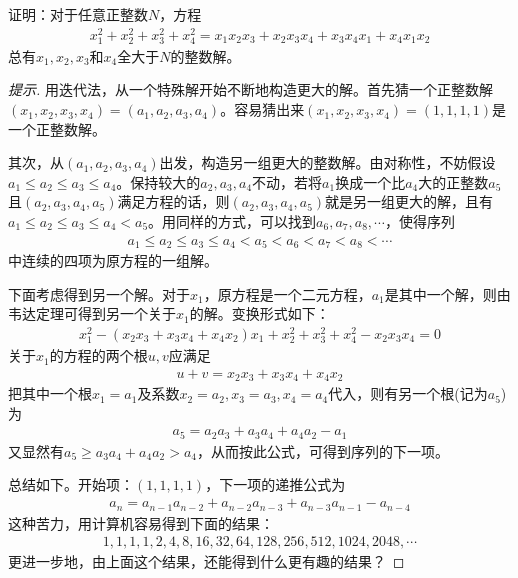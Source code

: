 \begin{example}[Putnam 1988]
  证明：对于任意正整数$N$，方程
  \begin{align*}
    x_1^2+x_2^2+x_3^2+x_4^2=x_1x_2x_3+x_2x_3x_4+x_3x_4x_1 + x_4x_1x_2
  \end{align*}
  总有$x_1,x_2,x_3$和$x_4$全大于$N$的整数解。
\end{example}
\begin{proof}[提示]用迭代法，从一个特殊解开始不断地构造更大的解。首先猜一个正整数解$(x_1,x_2,x_3,x_4)=(a_1,a_2,a_3,a_4)$。容易猜出来$(x_1,x_2,x_3,x_4)=(1,1,1,1)$是一个正整数解。

  其次，从$(a_1,a_2,a_3,a_4)$出发，构造另一组更大的整数解。由对称性，不妨假设$a_1\le a_2\le a_3\le a_4$。保持较大的$a_2,a_3,a_4$不动，若将$a_1$换成一个比$a_4$大的正整数$a_5$且$(a_2,a_3,a_4,a_5)$满足方程的话，则$\left(a_2, a_3,a_4, a_5\right)$就是另一组更大的解，且有
  $a_1\le a_2\le a_3\le a_4 < a_5$。用同样的方式，可以找到$a_6, a_7, a_8, \cdots$，使得序列
  \begin{align*}
    a_1\le a_2\le a_3\le a_4 < a_5 < a_6 < a_7 < a_8 < \cdots
  \end{align*}
  中连续的四项为原方程的一组解。

  下面考虑得到另一个解。对于$x_1$，原方程是一个二元方程，$a_1$是其中一个解，则由韦达定理可得到另一个关于$x_1$的解。变换形式如下：
  \begin{align*}
    x_1^2 - (x_2x_3+x_3x_4+x_4x_2)x_1 + x_2^2 + x_3^2 + x_4^2 - x_2x_3x_4=0
  \end{align*}
  关于$x_1$的方程的两个根$u, v$应满足
  \begin{align*}
    u + v = x_2x_3+x_3x_4+x_4x_2
  \end{align*}
  把其中一个根$x_1=a_1$及系数$x_2=a_2, x_3=a_3, x_4=a_4$代入，则有另一个根(记为$a_5$)为
  \begin{align*}
    a_5 = a_2a_3 + a_3a_4 + a_4a_2 - a_1
  \end{align*}
  又显然有$a_5  \ge a_3a_4 + a_4a_2 > a_4$，从而按此公式，可得到序列的下一项。

  总结如下。开始项：$(1,1,1,1)$，下一项的递推公式为
  \begin{align*}
    a_n = %
    a_{n-1}a_{n-2} + a_{n-2}a_{n-3} + a_{n-3}a_{n-1} - a_{n-4}
  \end{align*}
  这种苦力，用计算机容易得到下面的结果：
  \begin{align*}
    1,1,1,1,2, 4, 8, 16, 32, 64, 128, 256, 512, 1024, 2048,\cdots
  \end{align*}
  更进一步地，由上面这个结果，还能得到什么更有趣的结果？
\end{proof}


